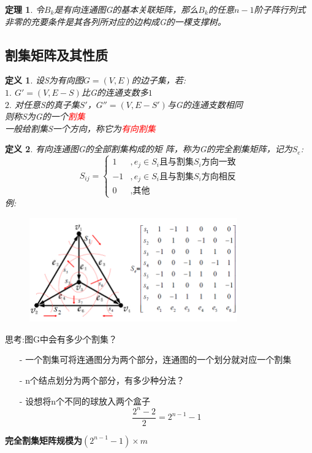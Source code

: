 \documentclass[11pt,a4paper,openany]{book}
\newcommand{\hwxw}{\CJKfamily{hwxw}}
\newtheorem{theorem}{\textbf{定理}}[section]
\newtheorem{defination}{\textbf{定义}}[section]
\begin{document}
\begin{theorem}
令$B_k$是有向连通图G的基本关联矩阵，那么$B_k$的任意$n-1$阶子阵行列式非零的充要条件是其各列所对应的边构成G的一棵支撑树。\\
\end{theorem}

\subsection{割集矩阵及其性质}
\begin{defination}
设S为有向图$G=(V,E)$的边子集，若:\\
$1.$ $G'=(V,E-S)$比G的连通支数多$1$\\
$2.$ 对任意S的真子集$S'$，$G''=(V,E-S')$与G的连通支数相同\\
则称S为G的一个\textcolor{red}{割集}\\
一般给割集S一个方向，称它为\textcolor{red}{有向割集}\\
\end{defination}

\begin{defination}
有向连通图G的全部割集构成的矩
阵，称为G的完全割集矩阵，记为$S_e$:
$$S_{ij}=\begin{cases}
1 &,e_j\in S_i \text{且与割集}S_i \text{方向一致}\\
-1&,e_j\in S_i \text{且与割集}S_i \text{方向相反}\\
0&,\text{其他}
\end{cases}
$$
例:\\
\begin{figure}[H]
  \centering
  \includegraphics[width=0.8\textwidth]{f3.png}\\
  \caption*{}
\end{figure}
\end{defination}

\begin{shaded}
{\hwxw 思考:图G中会有多少个割集？}\\\begin{itemize}
                          \item[-]一个割集可将连通图分为两个部分，连通图的一个划分就对应一个割集
                          \item[-] n个结点划分为两个部分，有多少种分法？
                          \item[-]设想将n个不同的球放入两个盒子$$\frac{2^n-2}{2}=2^{n-1}-1$$
                        \end{itemize}
\textbf{完全割集矩阵规模为$(2^{n-1}-1)\times m$}
\end{shaded}
\end{document}
